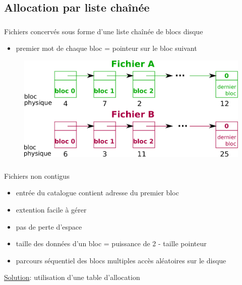 \subsection{Allocation par liste chaînée}
\begin{frame}
\frametitle{\insertsubsection}
Fichiers concervés sous forme d'une liste chaînée de blocs disque
\begin{itemize}
\item premier mot de chaque bloc = pointeur sur le bloc suivant
\end{itemize}
\begin{figure}
  \includegraphics[width=0.8\linewidth]{fig4/liste_chainee}
\end{figure}
\end{frame}

\begin{frame}
  \frametitle{\insertsubsection}
  Fichiers non contigus
  \begin{itemize}
  \item entrée du catalogue contient adresse du premier bloc
  \item extention facile à gérer
  \item pas de perte d'espace 
  \end{itemize}
  \vspace{0.5cm}
  \begin{itemize}
  \item taille des données d'un bloc = puissance de 2 - taille pointeur
  \item parcours séquentiel des blocs  multiples accès aléatoires sur le disque
  \end{itemize}
  \underline{Solution}: utilisation d'une \alert{table d'allocation}
\end{frame}

